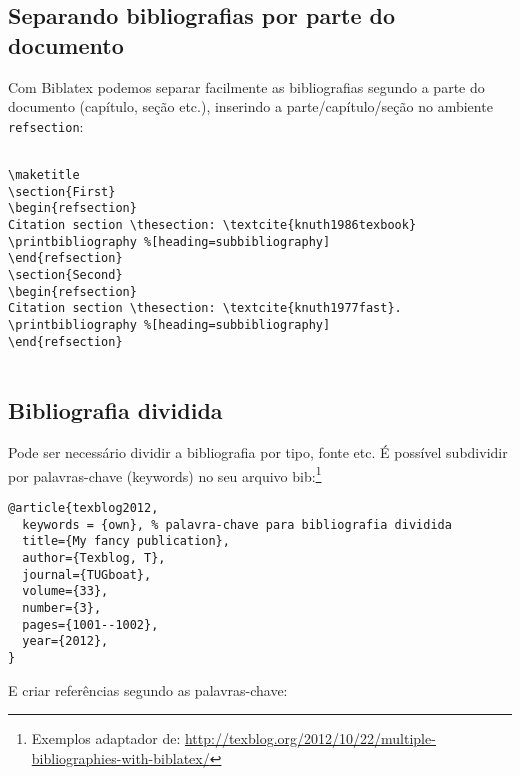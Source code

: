\subsection{Separando bibliografias por parte do documento}

Com \textsf{Biblatex} podemos separar facilmente as bibliografias segundo a parte do documento (capítulo, seção etc.), inserindo a parte/capítulo/seção no ambiente \verb+refsection+:


\begin{verbatim}

\maketitle
\section{First}
\begin{refsection}
Citation section \thesection: \textcite{knuth1986texbook}
\printbibliography %[heading=subbibliography]
\end{refsection}
\section{Second}
\begin{refsection}
Citation section \thesection: \textcite{knuth1977fast}.
\printbibliography %[heading=subbibliography]
\end{refsection}


\end{verbatim}

\subsection{Bibliografia dividida}

Pode ser necessário dividir a bibliografia por tipo, fonte etc. É possível subdividir por palavras-chave (keywords) no seu arquivo bib:\footnote{Exemplos adaptador de: \url{http://texblog.org/2012/10/22/multiple-bibliographies-with-biblatex/}}


\begin{verbatim}
@article{texblog2012,
  keywords = {own}, % palavra-chave para bibliografia dividida
  title={My fancy publication},
  author={Texblog, T},
  journal={TUGboat},
  volume={33},
  number={3},
  pages={1001--1002},
  year={2012},
}

\end{verbatim}
E criar  referências segundo as palavras-chave:

